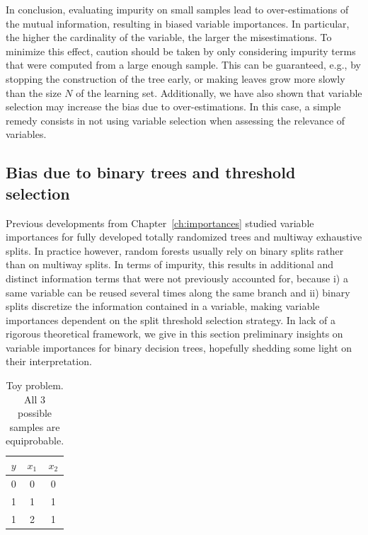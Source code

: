 In conclusion, evaluating impurity on small samples lead to over-estimations of
the mutual information, resulting in biased variable importances. In
particular, the higher the cardinality of the variable,  the larger the
misestimations. To minimize this effect, caution should be taken by only
considering impurity terms that were computed from a large enough sample. This
can be guaranteed, e.g., by stopping the construction of the tree early, or
making leaves grow more slowly than the size $N$ of the learning set.
Additionally, we have also shown that variable selection may increase the bias
due to over-estimations. In this case, a simple remedy consists in not using
variable selection when assessing the relevance of variables.

\subsection{Bias due to binary trees and threshold selection}
\label{sec:bias:tree}

Previous developments from Chapter~\ref{ch:importances} studied variable
importances for fully developed totally randomized trees and multiway
exhaustive splits. In practice however, random forests usually rely on binary
splits rather than on multiway splits. In terms of impurity, this results in
additional and distinct information terms that were not previously accounted
for, because i) a same variable can be reused several times along the same
branch and ii) binary splits discretize the information contained in a
variable, making variable importances dependent on the split threshold selection
strategy. In lack of a rigorous theoretical framework, we give in this section
preliminary insights on variable importances for binary decision trees,
hopefully shedding some light on their interpretation.

\begin{table}
    \centering
    \begin{tabular}{| c | c c |}
    \hline
    $y$ & $x_1$ & $x_2$ \\
    \hline
    \hline
    0 & 0 & 0 \\
    1 & 1 & 1 \\
    1 & 2 & 1 \\
    \hline
    \end{tabular}
    \caption{Toy problem. All $3$ possible samples are equiprobable.}
    \label{table:simulation:bias:tree}
\end{table}

